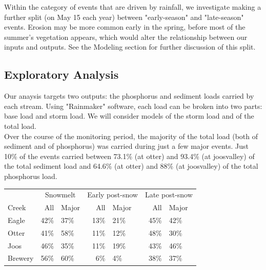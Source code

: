 \documentclass[12pt]{article}
\begin{document}
Within the category of events that are driven by rainfall, we investigate making a further split (on May 15 each year) between "early-season" and "late-season" events. Erosion may be more common early in the spring, before most of the summer's vegetation appears, which would alter the relationship between our inputs and outputs. See the Modeling section for further discussion of this split.\\

\subsection{Exploratory Analysis}
Our anaysis targets two outputs: the phosphorus and sediment loads carried by each stream. Using "Rainmaker" software, each load can be broken into two parts: base load and storm load. We will consider models of the storm load and of the total load.\\

Over the course of the monitoring period, the majority of the total load (both of sediment and of phosphorus) was carried during just a few major events. Just 10\% of the events carried between 73.1\% (at otter) and 93.4\% (at joosvalley) of the total sediment load and 64.6\% (at otter) and 88\% (at joosvalley) of the total phosphorus load.\\




\begin{table}[h]
    \begin{center}
    \begin{tabular}{lr|lr|lr|l}
        & \multicolumn{2}{c}{Snowmelt    }\ & \multicolumn{2}{c}{Early post-snow}\ & \multicolumn{2}{c}{Late post-snow} \\
        Creek & All & Major & All & Major & All & Major \\
        \hline 
        Eagle & 42\% & 37\% & 13\% & 21\% & 45\% & 42\% \\
        Otter & 41\% & 58\% & 11\% & 12\% & 48\% & 30\% \\
        Joos & 46\% & 35\% & 11\% & 19\% & 43\% & 46\% \\
        
        Brewery & 56\% & 60\% & 6\% & 4\% & 38\% & 37\% \\
        
    \end{tabular}
    \end{center}
\end{table}
\end{document}
